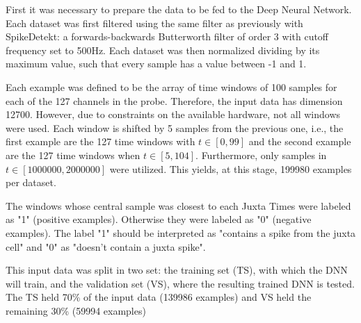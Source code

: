 \documentclass[10pt]{article}
\begin{document}
First it was necessary to prepare the data to be fed to the Deep Neural Network. Each dataset was first filtered using the same filter as previously with SpikeDetekt: a forwards-backwards Butterworth filter of order 3 with cutoff frequency set to 500Hz. Each dataset was then normalized dividing by its maximum value, such that every sample has a value between -1 and 1.


Each example was defined to be the array of time windows of 100 samples for each of the 127 channels in the probe. Therefore, the input data has dimension 12700. However, due to constraints on the available hardware, not all windows were used. Each window is shifted by 5 samples from the previous one, i.e., the first example are the 127 time windows with $t \in [ 0 , 99]$ and the second example are the 127 time windows when $t \in [ 5, 104]$. Furthermore, only samples in $t \in [1000000,2000000]$ were utilized. This yields, at this stage, 199980 examples per dataset.

The windows whose central sample was closest to each Juxta Times were labeled as "1" (positive examples). Otherwise they were labeled as "0" (negative examples). The label "1" should be interpreted as "contains a spike from the juxta cell" and "0" as "doesn't contain a juxta spike".

This input data was split in two set: the training set (TS), with which the DNN will train, and the validation set (VS), where the resulting trained DNN is tested. The TS held 70\% of the input data (139986 examples) and VS held the remaining 30\% (59994 examples)
%
\end{document}
